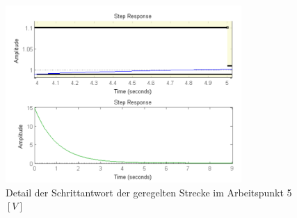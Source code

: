 \begin{figure}[h!]
    \centering
    \includegraphics[width=0.8\textwidth]{10/siso_step_detail_g5.pdf}
    \caption{Detail der Schrittantwort der geregelten Strecke im Arbeitspunkt 5$\si{[V]}$}
    \label{fig:10_step_detail_5}
\end{figure}

